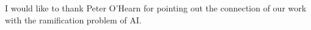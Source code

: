 I would like to thank Peter O'Hearn for pointing out the connection
of our work with the ramification problem of AI.


% 
% 
% 
% 
% 
% 
